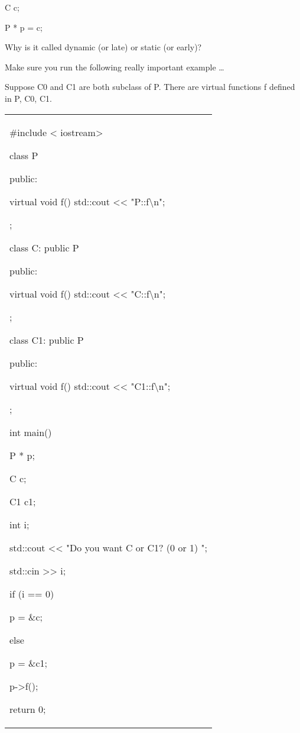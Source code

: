 C c;

P * p = c;

Why is it called dynamic (or late) or static (or early)?

Make sure you run the following really important example \ldots{}

Suppose C0 and C1 are both subclass of P. There are virtual functions f
defined in P, C0, C1.

\begin{longtable}[]{@{}
  >{\raggedright\arraybackslash}p{}@{}}
\toprule\noalign{}
 \\
\midrule\noalign{}
\endhead
\bottomrule\noalign{}
\endlastfoot
\#include < iostream\textgreater{}

class P

{

public:

virtual void f() { std::cout <<{}
"P::f\textbackslash n"; }

};

class C: public P

{

public:

virtual void f() { std::cout <<{}
"C::f\textbackslash n"; }

};

class C1: public P

{

public:

virtual void f() { std::cout <<{}
"C1::f\textbackslash n"; }

};

int main()

{

P * p;

C c;

C1 c1;

int i;

std::cout <<{} "Do you want C or C1? (0 or 1) ";

std::cin \textgreater\textgreater{} i;

if (i == 0)

{

p = \&c;

}

else

{

p = \&c1;

}

p-\textgreater f();

return 0;

} \\
\end{longtable}

